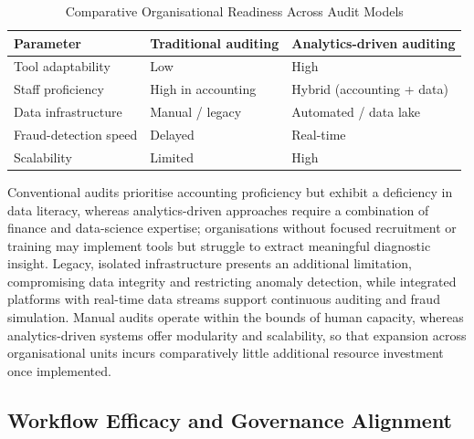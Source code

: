\documentclass[preprint,12pt]{elsarticle}
\begin{document}
\begin{table}[!t]
\caption{Comparative Organisational Readiness Across Audit Models}
\label{tab:readiness}
\centering
\footnotesize
\begin{tabular}{p{} p{} p{}}
\toprule
\textbf{Parameter} & \textbf{Traditional auditing} & \textbf{Analytics-driven auditing} \\
\midrule
Tool adaptability & Low & High \citep{wagener2025} \\
Staff proficiency & High in accounting & Hybrid (accounting + data) \citep{oliveira2022} \\
Data infrastructure & Manual / legacy & Automated / data lake \\
Fraud-detection speed & Delayed & Real-time \citep{naoufal2024} \\
Scalability & Limited & High \citep{okoodion2024} \\
\bottomrule
\end{tabular}
\end{table}

Conventional audits prioritise accounting proficiency but exhibit a deficiency in data literacy, whereas analytics-driven approaches require a combination of finance and data-science expertise; organisations without focused recruitment or training may implement tools but struggle to extract meaningful diagnostic insight. Legacy, isolated infrastructure presents an additional limitation, compromising data integrity and restricting anomaly detection, while integrated platforms with real-time data streams support continuous auditing and fraud simulation. Manual audits operate within the bounds of human capacity, whereas analytics-driven systems offer modularity and scalability, so that expansion across organisational units incurs comparatively little additional resource investment once implemented.

\subsection{Workflow Efficacy and Governance Alignment}
\end{document}
